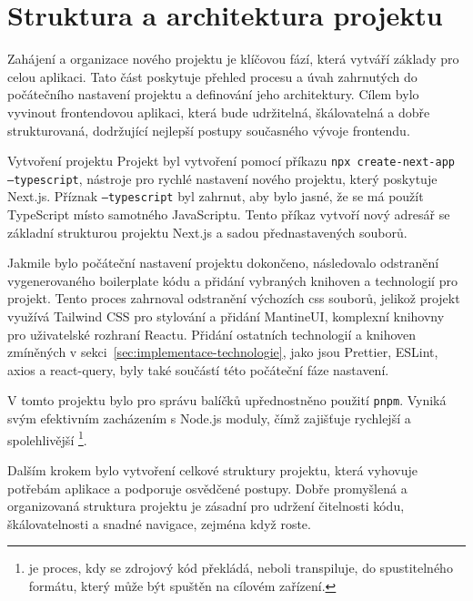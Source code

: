 \section{Struktura a architektura projektu}
\label{sec:implementace-architektura}
Zahájení a organizace nového projektu je klíčovou fází, která vytváří základy pro celou aplikaci.
Tato část poskytuje přehled procesu a úvah zahrnutých do počátečního nastavení projektu a definování jeho architektury.
Cílem bylo vyvinout frontendovou aplikaci, která bude udržitelná, škálovatelná a dobře strukturovaná, dodržující nejlepší postupy současného vývoje frontendu.

\begin{subsection}{Vytvoření projektu}
    \label{subsec:implementace-architektura-vytvoreni-projektu}
    Projekt byl vytvoření pomocí příkazu \texttt{npx create-next-app --typescript}, nástroje pro rychlé nastavení nového projektu, který poskytuje Next.js.
    Příznak \texttt{--typescript} byl zahrnut, aby bylo jasné, že se má použít TypeScript místo samotného JavaScriptu.
    Tento příkaz vytvoří nový adresář se základní strukturou projektu Next.js a sadou přednastavených souborů\cite{n_nextjs_org_docs}.

    Jakmile bylo počáteční nastavení projektu dokončeno, následovalo odstranění vygenerovaného boilerplate kódu a přidání vybraných knihoven a technologií pro projekt.
    Tento proces zahrnoval odstranění výchozích \ac{css} souborů, jelikož projekt využívá Tailwind CSS pro stylování a přidání MantineUI, komplexní knihovny pro uživatelské rozhraní Reactu.
    Přidání ostatních technologií a knihoven zmíněných v sekci~\ref{sec:implementace-technologie}, jako jsou Prettier, ESLint, axios a react-query, byly také součástí této počáteční fáze nastavení.

    V tomto projektu bylo pro správu balíčků upřednostněno použití \texttt{pnpm}.
    Vyniká svým efektivním zacházením s Node.js moduly, čímž zajišťuje rychlejší a spolehlivější \footnote{ je proces, kdy se zdrojový kód překládá, neboli transpiluje, do spustitelného formátu, který může být spuštěn na cílovém zařízení.}\cite{p__pnpm_io}.

    Dalším krokem bylo vytvoření celkové struktury projektu, která vyhovuje potřebám aplikace a podporuje osvědčené postupy.
    Dobře promyšlená a organizovaná struktura projektu je zásadní pro udržení čitelnosti kódu, škálovatelnosti a snadné navigace, zejména když  roste.
\end{subsection}


